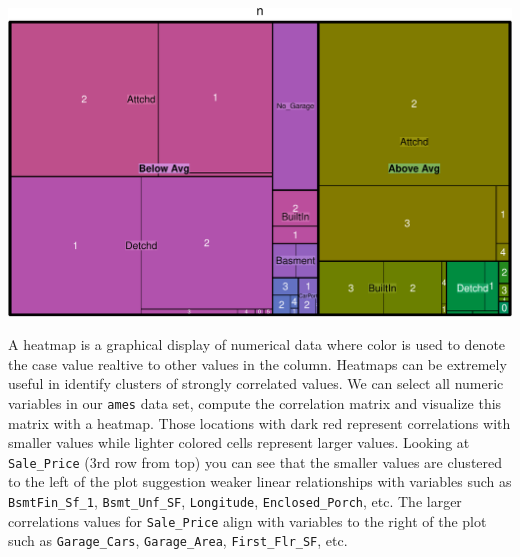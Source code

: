 \documentclass[]{article}
\newenvironment{Shaded}{\begin{snugshade}}{\end{snugshade}}
\newcommand{\KeywordTok}[1]{\textcolor[rgb]{0.13,0.29,0.53}{\textbf{#1}}}
\newcommand{\DataTypeTok}[1]{\textcolor[rgb]{0.13,0.29,0.53}{#1}}
\newcommand{\StringTok}[1]{\textcolor[rgb]{0.31,0.60,0.02}{#1}}
\newcommand{\OperatorTok}[1]{\textcolor[rgb]{0.81,0.36,0.00}{\textbf{#1}}}
\newcommand{\NormalTok}[1]{#1}
\begin{document}
\begin{Shaded}
\end{Shaded}

\begin{center}\includegraphics{Chapter_3_-_Visualization_files/figure-latex/mosaic2-1} \end{center}

A heatmap is a graphical display of numerical data where color is used
to denote the case value realtive to other values in the column.
Heatmaps can be extremely useful in identify clusters of strongly
correlated values. We can select all numeric variables in our
\texttt{ames} data set, compute the correlation matrix and visualize
this matrix with a heatmap. Those locations with dark red represent
correlations with smaller values while lighter colored cells represent
larger values. Looking at \texttt{Sale\_Price} (3rd row from top) you
can see that the smaller values are clustered to the left of the plot
suggestion weaker linear relationships with variables such as
\texttt{BsmtFin\_Sf\_1}, \texttt{Bsmt\_Unf\_SF}, \texttt{Longitude},
\texttt{Enclosed\_Porch}, etc. The larger correlations values for
\texttt{Sale\_Price} align with variables to the right of the plot such
as \texttt{Garage\_Cars}, \texttt{Garage\_Area},
\texttt{First\_Flr\_SF}, etc.
\end{document}

